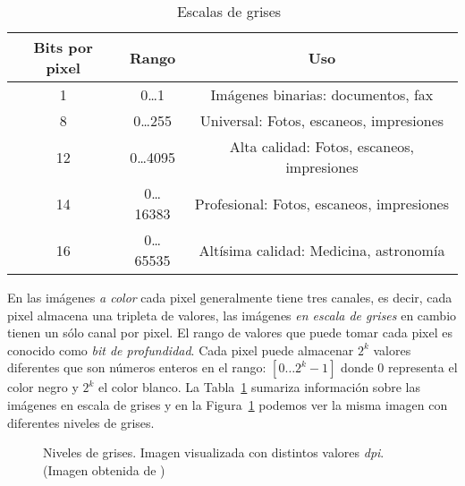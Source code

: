 \begin{table}
  \caption[Escala de grises]{Escalas de grises~\cite{burger2008digital}} 
  \label{table:grayscales}
\begin{center}
{\scriptsize
    \begin{tabular}{c|c|c}
    \hline
    {\bf Bits por pixel} & 
    {\bf Rango} & 
    {\bf Uso} \\
    \hline
    1  & 0\dots1     & Imágenes binarias: documentos, fax \\
    8  & 0\dots255   & Universal: Fotos, escaneos, impresiones   \\
    12 & 0\dots4095  & Alta calidad: Fotos, escaneos, impresiones   \\
    14 & 0\dots16383 & Profesional: Fotos, escaneos, impresiones   \\
    16 & 0\dots65535 & Altísima calidad: Medicina, astronomía   \\
    \hline
    \end{tabular}
}
\end{center}
\end{table}

En las imágenes \textit{a color} cada pixel generalmente tiene tres canales, es
decir, cada pixel almacena una tripleta de valores, las imágenes \textit{en
escala de grises} en cambio tienen un sólo canal por pixel. El rango de valores
que puede tomar cada pixel es conocido como \textit{bit de profundidad}. Cada
pixel puede almacenar $2^k$ valores diferentes que son números enteros en el
rango: $[0\dots2^k - 1]$ donde $0$ representa el color negro y $2^k$ el color
blanco. La Tabla~\ref{table:grayscales} sumariza información sobre las imágenes
en escala de grises y en la Figura~\ref{grayscales} podemos ver la misma imagen
con diferentes niveles de grises.

\begin{figure}[h]
    \centering


  \caption[Niveles de grises]{Niveles de grises. Imagen visualizada con
  distintos valores \textit{dpi}. (Imagen obtenida de \cite{sipi})}
  
  \label{grayscales}
\end{figure}

